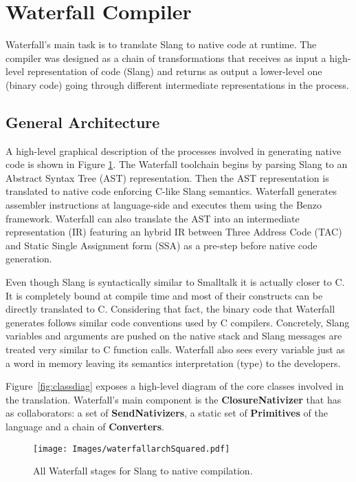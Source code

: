 \documentclass[10pt,preprint,letter]{sigplanconf}
\newcommand{\ST}  {Small\-talk\xspace}
\newcommand{\W}{Waterfall\xspace}
\newcommand{\B}{Benzo\xspace}
\begin{document}
 
\section{\W Compiler}
\label{waterfall}
\W's main task is to translate Slang to native code at runtime.
The compiler was designed as a chain of transformations that receives as input a high-level representation of code (Slang) and returns as output a lower-level one (binary code) going through different intermediate representations in the process. 

\subsection{General Architecture} 
A high-level graphical description of the processes involved in generating native code is shown in Figure \ref{fig:ejemplo}.
The \W toolchain begins by parsing Slang to an Abstract Syntax Tree (AST) representation. 
Then the AST representation is translated to native code enforcing C-like Slang semantics.
\W generates assembler instructions at language-side and executes them using the \B framework.
\W can also translate the AST into an intermediate representation (IR) featuring an hybrid IR between Three Address Code (TAC) and Static Single Assignment form (SSA) as a pre-step before native code generation. 

Even though Slang is syntactically similar to \ST it is actually closer to C. 
It is completely bound at compile time and most of their constructs can be directly translated to C. Considering that fact, the binary code that \W generates follows similar code conventions used by  C compilers.   
Concretely, Slang variables and arguments are pushed on the native stack and Slang messages are treated very similar to C function calls. 
\W also sees every variable just as a word in memory leaving its semantics interpretation (type) to the developers. 

Figure~\ref{fig:classdiag} exposes a high-level diagram of the core classes involved in the translation. 
\W's main component is the \textbf{ClosureNativizer} that has as collaborators: a set of \textbf{SendNativizers}, a static set of \textbf{Primitives} of the language and a chain of \textbf{Converters}. 

\begin{figure}
\begin{center}
\texttt{[image: Images/waterfallarchSquared.pdf]}
\caption{All \W stages for Slang to native compilation.}
\label{fig:ejemplo}
\end{center}
\end{figure}
\end{document}
